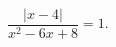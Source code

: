 \begin{ex}[type=equation]
	\begin{condition}
		$\dfrac{\big|x - 4\big|}{x^2 - 6x + 8}= 1.$
	\end{condition}
\end{ex}
